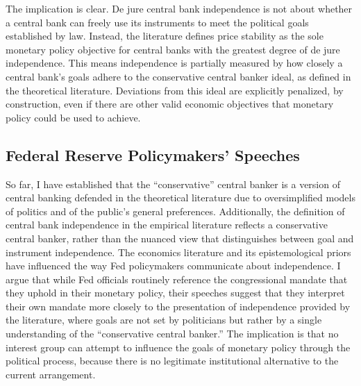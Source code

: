 \documentclass[12pt,a4paper]{article}
\begin{document}
\begin{doublespace}
The implication is clear. De jure central bank independence is not about whether a central bank can freely use its instruments to meet the political goals established by law. Instead, the literature defines price stability as the sole monetary policy objective for central banks with the greatest degree of de jure independence. This means independence is partially measured by how closely a central bank's goals adhere to the conservative central banker ideal, as defined in the theoretical literature. Deviations from this ideal are explicitly penalized, by construction, even if there are other valid economic objectives that monetary policy could be used to achieve.

\subsection{Federal Reserve Policymakers' Speeches}
\label{sec:gov_speeches_analysis}
So far, I have established that the ``conservative'' central banker is a version of central banking defended in the theoretical literature due to oversimplified models of politics and of the public's general preferences. Additionally, the definition of central bank independence in the empirical literature reflects a conservative central banker, rather than the nuanced view that distinguishes between goal and instrument independence. The economics literature and its epistemological priors have influenced the way Fed policymakers communicate about independence. I argue that while Fed officials routinely reference the congressional mandate that they uphold in their monetary policy, their speeches suggest that they interpret their own mandate more closely to the presentation of independence provided by the literature, where goals are not set by politicians but rather by a single understanding of the ``conservative central banker.'' The implication is that no interest group can attempt to influence the goals of monetary policy through the political process, because there is no legitimate institutional alternative to the current arrangement.


\end{doublespace}
\end{document}
